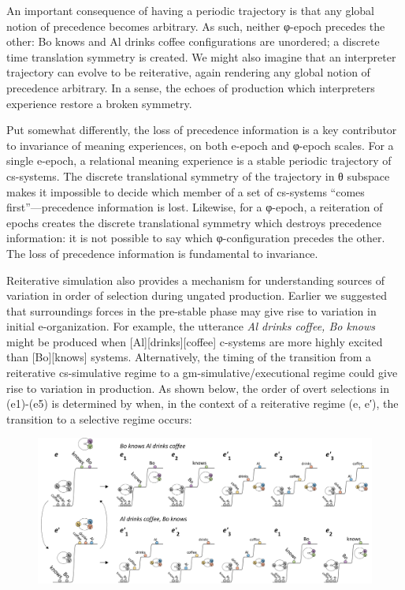   An important consequence of having a periodic trajectory is that any global notion of precedence becomes arbitrary. As such, neither φ-epoch precedes the other: {\textbar}Bo knows{\textbar} and {\textbar}Al drinks coffee{\textbar} configurations are unordered; a discrete time translation symmetry is created. We might also imagine that an interpreter trajectory can evolve to be reiterative, again rendering any global notion of precedence arbitrary. In a sense, the echoes of production which interpreters experience restore a broken symmetry. 

  Put somewhat differently, the loss of precedence information is a key contributor to invariance of meaning experiences, on both e-epoch and φ-epoch scales. For a single e-epoch, a relational meaning experience is a stable periodic trajectory of cs-systems. The discrete translational symmetry of the trajectory in θ subspace makes it impossible to decide which member of a set of cs-systems “comes first”—precedence information is lost. Likewise, for a φ-epoch, a reiteration of epochs creates the discrete translational symmetry which destroys precedence information: it is not possible to say which φ-configuration precedes the other. The loss of precedence information is fundamental to invariance. 

  Reiterative simulation also provides a mechanism for understanding sources of variation in order of selection during ungated production. Earlier we suggested that surroundings forces in the pre-stable phase may give rise to variation in initial e-organization. For example, the utterance \textit{Al drinks coffee, Bo knows} might be produced when [Al][drinks][coffee] c-systems are more highly excited than [Bo][knows] systems. Alternatively, the timing of the transition from a reiterative cs-simulative regime to a gm-simulative/executional regime could give rise to variation in production. As shown below, the order of overt selections in (e1)-(e5) is determined by when, in the context of a reiterative regime (e, e′), the transition to a selective regime occurs:

  
\begin{figure}
\includegraphics[width=\textwidth]{figures/Tilsen-img116.png}
\caption{\missingcaption}
\label{fig:5:12}
\end{figure}
 

